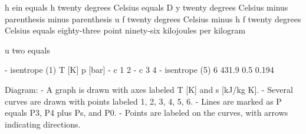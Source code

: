h ein equals h twenty degrees Celsius equals D y twenty degrees Celsius minus parenthesis minus parenthesis u f twenty degrees Celsius minus h f twenty degrees Celsius equals eighty-three point ninety-six kilojoules per kilogram

u two equals

- isentrope (1) T [K] p [bar]
- c 1 2
- c 3 4
- isentrope (5) 6 431.9 0.5 0.194

Diagram:
- A graph is drawn with axes labeled T [K] and s [kJ/kg K].
- Several curves are drawn with points labeled 1, 2, 3, 4, 5, 6.
- Lines are marked as P equals P3, P4 plus Ps, and P0.
- Points are labeled on the curves, with arrows indicating directions.
